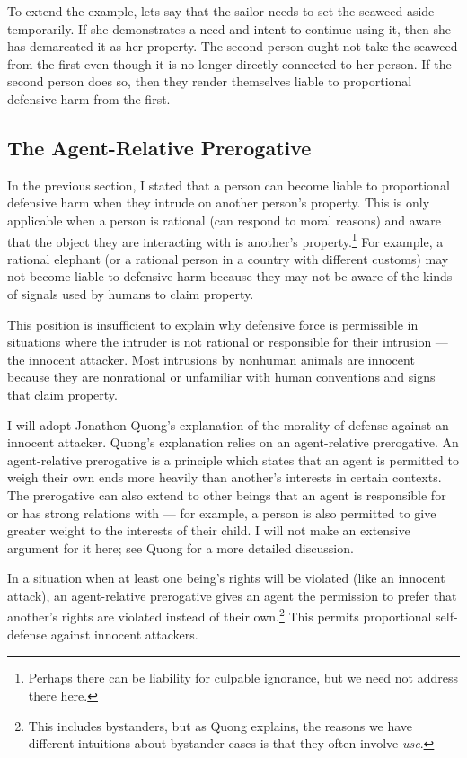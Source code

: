 	To extend the example, lets say that the sailor needs to set the seaweed
	aside temporarily. If she demonstrates a need and intent to continue using
	it, then she has demarcated it as her property. The second person ought not
	take the seaweed from the first even though it is no longer directly
	connected to her person. If the second person does so, then they render
	themselves liable to proportional defensive harm from the first.

	\subsection{The Agent-Relative Prerogative}

	In the previous section, I stated that a person can become liable to
	proportional defensive harm when they intrude on another person’s property.
	This is only applicable when a person is rational (can respond to moral
	reasons) and aware that the object they are interacting with is another’s
	property.\footnote{Perhaps there can be liability for culpable ignorance,
	but we need not address there here.} For example, a rational elephant (or a
	rational person in a country with different customs) may not become liable
	to defensive harm because they may not be aware of the kinds of signals
	used by humans to claim property.

	This position is insufficient to explain why defensive force is permissible
	in situations where the intruder is not rational or responsible for their
	intrusion --- the innocent attacker.  Most intrusions by nonhuman animals
	are innocent because they are nonrational or unfamiliar with human
	conventions and signs that claim property.

	I will adopt Jonathon Quong’s explanation of the morality of defense against
	an innocent attacker. Quong’s explanation relies on an agent-relative
	prerogative. An agent-relative prerogative is a principle which states that
	an agent is permitted to weigh their own ends more heavily than another’s
	interests in certain contexts. The prerogative can also extend to other
	beings that an agent is responsible for or has strong relations with ---
	for example, a person is also permitted to give greater weight to the
	interests of their child. I will not make an extensive argument for it
	here; see Quong for a more detailed discussion.

	In a situation when at least one being’s rights will be violated (like an
	innocent attack), an agent-relative prerogative gives an agent the
	permission to prefer that another’s rights are violated instead of their
	own.\footnote{This includes bystanders, but as Quong explains, the reasons
	we have different intuitions about bystander cases is that they often
	involve \emph{use}.} This permits proportional self-defense against innocent
	attackers.
	
